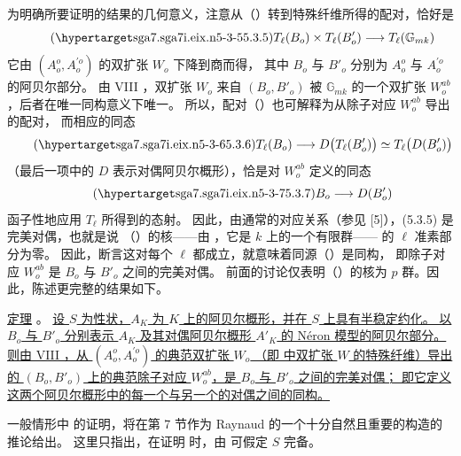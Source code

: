 为明确所要证明的结果的几何意义，注意从（）转到特殊纤维所得的配对，恰好是
\begin{equation}\tag{\SGARefTarget{sga7.sga7i.eix.n5-3-5}{5.3.5}}
 T_\ell(B_o)\times T_\ell(B'_o)
 \longrightarrow T_\ell(\mathbb G_{mk})
\end{equation}
它由 $(A_o^o,A_o^{\prime o})$ 的双扩张 $W_o$ 下降到商而得，
其中 $B_o$ 与 $B'_o$ 分别为 $A_o^o$ 与 $A_o^{\prime o}$ 的阿贝尔部分。
由 VIII ，双扩张 $W_o$ 来自
$(B_o,B'_o)$ 被 $\mathbb G_{mk}$ 的一个双扩张 $W_o^{ab}$，后者在唯一同构意义下唯一。
所以，配对（）也可解释为从除子对应 $W_o^{ab}$ 导出的配对，
而相应的同态
\begin{equation}\tag{\SGARefTarget{sga7.sga7i.eix.n5-3-6}{5.3.6}}
 T_\ell(B_o)
 \longrightarrow D\bigl(T_\ell(B'_o)\bigr)
 \simeq T_\ell\bigl(D(B'_o)\bigr)
\end{equation}
（最后一项中的 $D$ 表示对偶阿贝尔概形），恰是对 $W_o^{ab}$ 定义的同态
\begin{equation}\tag{\SGARefTarget{sga7.sga7i.eix.n5-3-7}{5.3.7}}
 B_o\longrightarrow D(B'_o)
\end{equation}
函子性地应用 $T_\ell$ 所得到的态射。
因此，由通常的对应关系（参见 [5]），(5.3.5) 是完美对偶，也就是说
（）的核——由 ，它是 $k$ 上的一个有限群——
的 $\ell$ 准素部分为零。
因此，断言这对每个 $\ell$ 都成立，就意味着同源（）是同构，
即除子对应 $W_o^{ab}$ 是 $B_o$ 与 $B'_o$ 之间的完美对偶。
前面的讨论仅表明（）的核为 $p$ 群。因此，陈述更完整的结果如下。

\medskip
\noindent
\underline{定理} 。
\underline{设 $S$ 为性状，$A_K$ 为 $K$ 上的阿贝尔概形，并在 $S$ 上具有半稳定约化。
以 $B_o$ 与 $B'_o$ 分别表示 $A_K$ 及其对偶阿贝尔概形 $A'_K$ 的 N\'eron 模型的阿贝尔部分。
则由 VIII ，从 $(A_o^o,A_o^{\prime o})$ 的典范双扩张 $W_o$
（即  中双扩张 $W$ 的特殊纤维）导出的
$(B_o,B'_o)$ 上的典范除子对应 $W_o^{ab}$，是 $B_o$ 与 $B'_o$ 之间的完美对偶；
即它定义这两个阿贝尔概形中的每一个与另一个的对偶之间的同构。}

一般情形中  的证明，将在第 7 节作为 Raynaud 的一个十分自然且重要的构造的推论给出。
这里只指出，在证明  时，由  可假定 $S$ 完备。

